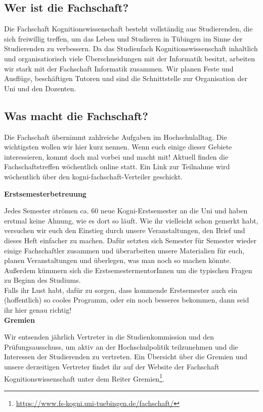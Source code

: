 \subsection{Wer ist die Fachschaft?}
Die Fachschaft Kognitionswissenschaft besteht vollständig aus Studierenden, die sich freiwillig treffen, um das Leben und Studieren in Tübingen im Sinne der Studierenden zu verbessern. Da das Studienfach Kognitionswissenschaft inhaltlich und organisatiorisch viele Überschneidungen mit der Informatik besitzt, arbeiten wir stark mit der Fachschaft Informatik zusammen.
Wir planen Feste und Ausflüge, beschäftigen Tutoren und sind die Schnittstelle zur Organisation der Uni und den Dozenten.

\subsection{Was macht die Fachschaft?}
Die Fachschaft übernimmt zahlreiche Aufgaben im Hochschulalltag. Die wichtigsten wollen wir hier kurz nennen. Wenn euch einige dieser Gebiete interessieren, kommt doch mal vorbei und macht mit! Aktuell finden die Fachschaftstreffen wöchentlich online statt. Ein Link zur Teilnahme wird wöchentlich über den kogni-fachschaft-Verteiler geschickt.

\textbf{Erstsemesterbetreuung}

Jedes Semester strömen ca. 60 neue Kogni-Erstsemester an die Uni und haben erstmal keine Ahnung, wie es dort so läuft. Wie ihr vielleicht schon gemerkt habt, versuchen wir euch den Einstieg durch unsere Veranstaltungen, den Brief und dieses Heft einfacher zu machen. Dafür setzten sich Semester für Semester wieder einige Fachschaftler zusammen und überarbeiten unsere Materialien für euch, planen Veranstaltungen und überlegen, was man noch so machen könnte. Außerdem kümmern sich die ErstsemestermentorInnen um die typischen Fragen zu Beginn des Studiums.\\
Falls ihr Lust habt, dafür zu sorgen, dass kommende Erstsemester auch ein (hoffentlich) so cooles Programm, oder ein noch besseres bekommen, dann seid ihr hier genau richtig!\\

\textbf{Gremien}

Wir entsenden jährlich Vertreter in die Studienkommission und den Prüfungsausschuss, um aktiv an der Hochschulpolitik teilzunehmen und die Interessen der Studierenden zu vertreten. Ein Übersicht über die Gremien und unsere derzeitigen Vertreter findet ihr auf der Website der Fachschaft Kognitionswissenschaft unter dem Reiter Gremien\footnote{\url{https://www.fs-kogni.uni-tuebingen.de/fachschaft/}}. \\	%

